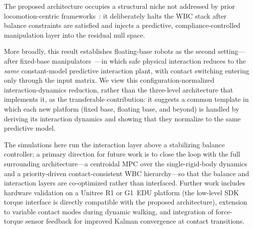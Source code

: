 The proposed architecture occupies a structural niche not addressed by prior
locomotion-centric frameworks~\cite{dicarlo2018dynamic,kim2019highly,bellicoso2016perception,koolen2016design}:
it deliberately halts the WBC stack after balance constraints are satisfied
and injects a predictive, compliance-controlled manipulation layer into the
residual null space.

More broadly, this result establishes floating-base robots as the second
setting---after fixed-base manipulators~\cite{cao2026impedance}---in which
safe physical interaction reduces to the \emph{same} constant-model
predictive interaction plant, with contact switching entering only through
the input matrix. We view this configuration-normalized interaction-dynamics
reduction, rather than the three-level architecture that implements it, as
the transferable contribution: it suggests a common template in which each
new platform (fixed base, floating base, and beyond) is handled by deriving
its interaction dynamics and showing that they normalize to the same
predictive model.

The simulations here run the interaction layer above a stabilizing balance
controller; a primary direction for future work is to close the loop with the
full surrounding architecture---a centroidal MPC over the single-rigid-body
dynamics and a priority-driven contact-consistent WBC hierarchy---so that the
balance and interaction layers are co-optimized rather than interfaced.
Further work includes hardware validation on a Unitree R1 or G1~EDU platform
(the low-level SDK torque interface is directly compatible with the proposed
architecture), extension to variable contact modes during dynamic walking,
and integration of force-torque sensor feedback for improved Kalman
convergence at contact transitions.



